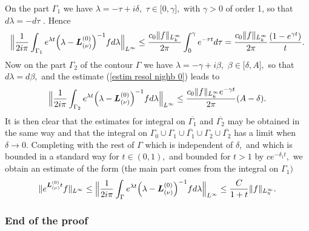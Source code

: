 \documentclass[11pt]{article}
\begin{document}
On the part $\Gamma _{1}$ we have $\lambda =-\tau +i\delta ,$ $\tau \in
\lbrack 0,\gamma ],$ with $\gamma >0$ of order 1, so that $d\lambda =-d\tau $%
. Hence%
\begin{equation*}
\Bigl\|\frac{1}{2i\pi }\int_{\Gamma _{1}}e^{\lambda t} \Bigl(\lambda -\boldsymbol{L}%
_{(\nu )}^{(0)} \Bigr)^{-1}fd\lambda  \Bigr\|_{L^{\infty }}\leq \frac{%
c_{0}\|f\|_{L_{k}^{\infty }}}{2\pi }\int_{0}^{\gamma }e^{-\tau t}d\tau =%
\frac{c_{0}\|f\|_{L_{k}^{\infty }}}{2\pi }\frac{(1-e^{\gamma t})}{t}.
\end{equation*}%
Now on the part $\Gamma _{2}$ of the contour $\Gamma $ we have $\lambda
=-\gamma +i\beta ,$ $\beta \in \lbrack \delta ,A],$ so that $d\lambda
=d\beta ,$ and the estimate (\ref{estim resol nighb 0}) leads to%
\begin{equation*}
\Bigl\|\frac{1}{2i\pi }\int_{\Gamma _{2}}e^{\lambda t} \Bigl(\lambda -\boldsymbol{L}%
_{(\nu )}^{(0)}\Bigr)^{-1}fd\lambda \Bigr\|_{L^{\infty }}\leq \frac{%
c_{0}\|f\|_{L_{k}^{\infty }}e^{-\gamma t}}{2\pi }(A-\delta ).
\end{equation*}%
It is then clear that the estimates for integral on $\overline{\Gamma _{1}}$
and $\overline{\Gamma _{2}}$ may be obtained in the same way and that the
integral on $\Gamma _{0}\cup \Gamma _{1}\cup \overline{\Gamma _{1}}\cup
\Gamma _{2}\cup \overline{\Gamma _{2}}$ has a limit when $\delta \rightarrow
0.$ Completing with the rest of $\Gamma $ which is independent of $\delta ,$
and which is bounded in a standard way for $t\in (0,1),$ and bounded for $%
t>1 $ by $ce^{-\delta _{1}t},$ we obtain an estimate of the form (the
main part comes from the integral on $\Gamma _{1})$%
\begin{equation*}
\|e^{\boldsymbol{L}_{(\nu )}^{(0)}t}f\|_{L^{\infty }}\leq \Bigl\|\frac{1}{2i\pi }%
\int_{\Gamma }e^{\lambda t} \Bigl(\lambda -\boldsymbol{L}_{(\nu
)}^{(0)} \Bigr)^{-1}fd\lambda \Bigr\|_{L^{\infty }}\leq \frac{C}{1+t}%
\|f\|_{L_{\eta}^{\infty }}.
\end{equation*}%



\subsubsection{End of the proof}

\end{document}
